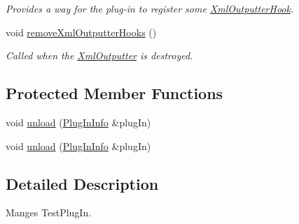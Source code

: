\begin{DoxyCompactItemize}
\begin{DoxyCompactList}\small\item\em Provides a way for the plug-\/in to register some \hyperlink{class_xml_outputter_hook}{Xml\+Outputter\+Hook}. \end{DoxyCompactList}\item 
void \hyperlink{class_plug_in_manager_a0fe59f82fd430ea57159a6ffad9a4035}{remove\+Xml\+Outputter\+Hooks} ()
\begin{DoxyCompactList}\small\item\em Called when the \hyperlink{class_xml_outputter}{Xml\+Outputter} is destroyed. \end{DoxyCompactList}\end{DoxyCompactItemize}
\subsection*{Protected Member Functions}
\begin{DoxyCompactItemize}
\item 
void \hyperlink{class_plug_in_manager_afc1fa045afaac73cd44f69839056f1e1}{unload} (\hyperlink{struct_plug_in_manager_1_1_plug_in_info}{Plug\+In\+Info} \&plug\+In)
\item 
void \hyperlink{class_plug_in_manager_afc1fa045afaac73cd44f69839056f1e1}{unload} (\hyperlink{struct_plug_in_manager_1_1_plug_in_info}{Plug\+In\+Info} \&plug\+In)
\end{DoxyCompactItemize}


\subsection{Detailed Description}
Manges Test\+Plug\+In. 

